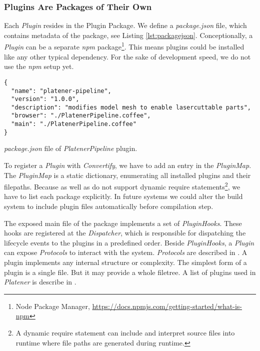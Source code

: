 \documentclass[../ClassicThesis.tex]{subfiles}
\begin{document}
\subsubsection{Plugins Are Packages of Their Own}

Each \emph{Plugin} resides in the Plugin Package. We define a
\emph{package.json} file, which contains metadata of the package, see Listing
\ref{lst:packagejson}. Conceptionally, a \emph{Plugin} can be a separate
\emph{npm} package\footnote{Node Package Manager,
  \url{https://docs.npmjs.com/getting-started/what-is-npm}}. This means plugins
could be installed like any other typical dependency. For the sake of
development speed, we do not use the \emph{npm} setup yet. 

\begin{listing}[ht]
\begin{verbatim}
{
  "name": "platener-pipeline",
  "version": "1.0.0",
  "description": "modifies model mesh to enable lasercuttable parts",
  "browser": "./PlatenerPipeline.coffee",
  "main": "./PlatenerPipeline.coffee"
}
\end{verbatim}
\caption{\emph{package.json} file of \emph{PlatenerPipeline} plugin.}
\label{lst:packagejson}
\end{listing}

To register a \emph{Plugin} with \emph{Convertify}, we have to add an entry in
the \emph{PluginMap}. The \emph{PluginMap} is a static dictionary, enumerating
all installed plugins and their filepaths. Because \emph{\nodejs} as well as
\emph{\essix} do not support dynamic require statements\footnote{A dynamic
  require statement can include and interpret source files into runtime where
  file paths are generated during runtime.}, we have to list each package
explicitly. In future systems we could alter the build system to include plugin
files automatically before compilation step.

The exposed main file of the package implements a set of \emph{PluginHooks}.
These hooks are registered at the \emph{Dispatcher}, which is responsible for
dispatching the lifecycle events to the plugins in a predefined order. Beside \emph{PluginHooks}, a \emph{Plugin} can expose
\emph{Protocols} to interact with the system. \emph{Protocols} are described in
. A plugin implements any internal structure or
complexity. The simplest form of a plugin is a single file. But it may provide a
whole filetree. A list of plugins used in \emph{Platener} is describe in
.
\end{document}
